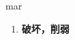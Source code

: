 
\begin{frame}
{\huge mar}
\begin{center}
\begin{enumerate}\Large
  \item \textbf{破坏，削弱}
\end{enumerate}
\end{center}
\end{frame}
